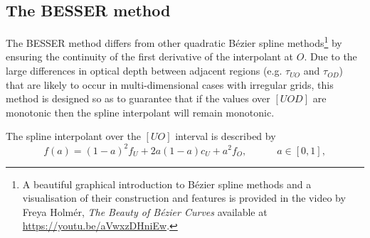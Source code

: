 \subsection{The BESSER method}

The BESSER method differs from other quadratic Bézier spline methods\footnote{A beautiful graphical introduction to Bézier spline methods and a visualisation of their construction and features is provided in the video by Freya Holmér, \emph{The Beauty of Bézier Curves} available at \url{https://youtu.be/aVwxzDHniEw}.} by ensuring the continuity of the first derivative of the interpolant at $O$.
Due to the large differences in optical depth between adjacent regions (e.g. $\tau_{UO}$ and $\tau_{OD}$) that are likely to occur in multi-dimensional cases with irregular grids, this method is designed so as to guarantee that if the values over $[UOD]$ are monotonic then the spline interpolant will remain monotonic.

The spline interpolant over the $[UO]$ interval is described by
\begin{equation}
    f(a) = (1-a)^2f_U + 2a(1-a)c_U + a^2f_O,\hspace{3em}a\in[0,1],
\end{equation}

